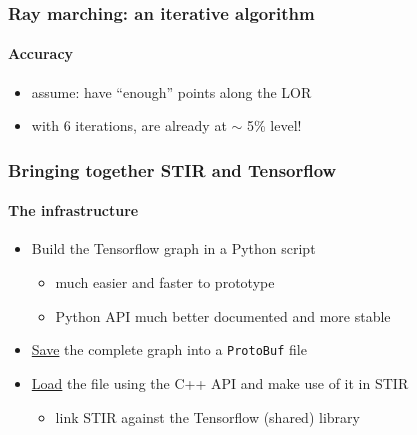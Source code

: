 \documentclass{beamer}
\begin{document}
\begin{frame}
  \frametitle{Ray marching: an iterative algorithm}
  \framesubtitle{Accuracy}
  \begin{itemize}
    \item assume: have ``enough'' points along the LOR
  \end{itemize}
  \begin{figure}
    \centering
  \end{figure}
  \begin{itemize}
    \item with 6 iterations, are already at $\sim$ 5\% level!
  \end{itemize}
\end{frame}


\begin{frame}
  \frametitle{Bringing together STIR and Tensorflow}
  \framesubtitle{The infrastructure}
  \begin{itemize}
    \item Build the Tensorflow graph in a Python script
      \begin{itemize}
        \item much easier and faster to prototype
        \item Python API much better documented and more stable
      \end{itemize}
    \item \underline{Save} the complete graph into a \texttt{ProtoBuf} file
    \item \underline{Load} the file using the C++ API and make use of it in STIR
      \begin{itemize}
        \item link STIR against the Tensorflow (shared) library
      \end{itemize}
  \end{itemize}
\end{frame}
\end{document}
